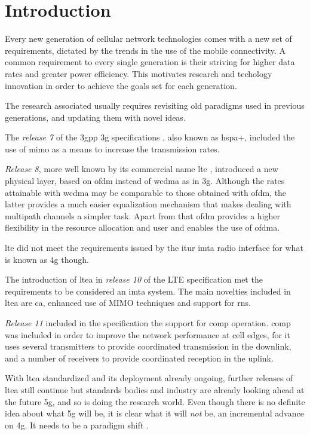 \chapter{Introduction}\label{ch:intro}

Every new generation of cellular network technologies comes with a new set of
requirements, dictated by the trends in the use of the mobile connectivity. A
common requirement to every single generation is their striving for higher data
rates and greater power efficiency. This motivates research and techology
innovation in order to achieve the goals set for each generation.


The research associated usually requires revisiting old paradigms used in
previous generations, and updating them with novel ideas.


The \emph{release 7} of the \gls{3gpp} \gls{3g} specifications \cite{3gpprel7},
also known as \gls{hspa+}, included the use of \gls{mimo} as a means to increase
the transmission rates.


\emph{Release 8}, more well known by its commercial name \gls{lte}
\cite{3gpplte}, introduced a new physical layer, based on \gls{ofdm} instead of
\gls{wcdma} as in \gls{3g}. Although the rates attainable with \gls{wcdma} may
be comparable to those obtained with \gls{ofdm}, the latter provides a much
easier equalization mechanism that makes dealing with multipath channels a
simpler task. Apart from that \gls{ofdm} provides a higher flexibility in the
resource allocation and user and enables the use of \gls{ofdma}.

\gls{lte} did not meet the requirements issued by the \gls{itur} \gls{imta}
radio interface \cite{imta} for what is known as \gls{4g} though.

The introduction of \gls{ltea} in \emph{release 10} of the LTE specification
\cite{3gppltea} met the requirements to be considered an \gls{imta} system. The
main novelties included in \gls{ltea} are \gls{ca}, enhanced use of MIMO
techniques and support for \glspl{rn}.

\emph{Release 11} \cite{3gpprel11} included in the specification the support for
\gls{comp} operation. \gls{comp} was included in order to improve the network
performance at cell edges, for it uses several transmitters to provide
coordinated transmission in the downlink, and a number of receivers to provide
coordinated reception in the uplink.

With \gls{ltea} standardized and its deployment already ongoing, further
releases of \gls{ltea} still continue but standards bodies and industry are
already looking ahead at the future \gls{5g}, and so is doing the research
world. Even though there is no definite idea about what \gls{5g} will be, it is 
clear what it will \emph{not} be, an incremental advance on \gls{4g}. It needs
to be a paradigm shift \cite{andrews14}.

